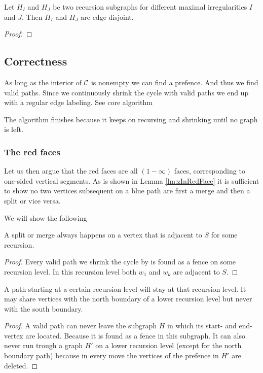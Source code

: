     \begin{lemma}
    Let $H_I$ and $H_J$ be two recursion subgraphs for different maximal irregularities $I$ and $J$. Then $H_I$ and $H_J$ are edge disjoint.
    \end{lemma}
    \begin{proof}
    \end{proof}

\subsection{Correctness}
  As long as the interior of $\mathcal{C}$ is nonempty we can find a prefence. And thus we find valid paths. Since we continuously shrink the cycle with valid paths we end up with a regular edge labeling.
  See core algorithm

  The algorithm finishes because it keeps on recursing and shrinking until no graph is left.

  \subsubsection{The red faces}
  Let us then argue that the red faces are all $(1-\infty)$ faces, corresponding to one-sided vertical segments. As is shown in Lemma \ref{lm:zInRedFace} it is sufficient to show no two vertices subsequent on a blue path are first a merge and then a split or vice versa.

  We will show the following
  \begin{lemma}
    A split or merge always happens on a vertex that is adjacent to $S$ for some recursion.
  \end{lemma}

  \begin{proof}
    Every valid path we shrink the cycle by is found as a fence on some recursion level. In this recursion level both $w_1$ and $w_k$ are adjacent to $S$.
  \end{proof}

  \begin{lemma}
    \label{lm:pathsStayOnRecursionLevel}
    A path starting at a certain recursion level will stay at that recursion level. It may share vertices with the north boundary of a lower recursion level but never with the south boundary.
  \end{lemma}
  \begin{proof}
    A valid path can never leave the subgraph $H$ in which its start- and end-vertex are located. Because it is found as a fence in this subgraph. It can also never run trough a graph $H'$ on a lower recursion level (except for the north boundary path)  because in every move the vertices of the prefence in $H'$ are deleted.
  \end{proof}

